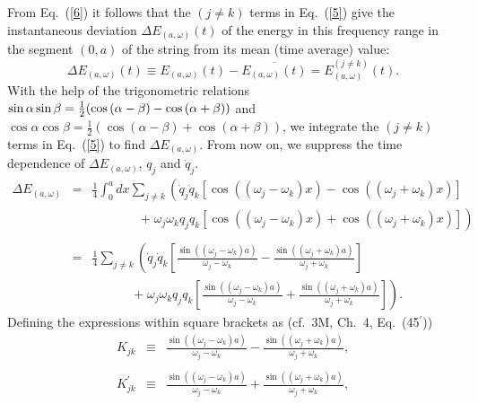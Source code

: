 \documentclass[12pt]{elsart}
\begin{document}
From Eq.\  (\ref{6}) it follows that the $(j \neq k)$ terms in Eq.\ (\ref{5}) give the instantaneous deviation $\Delta E_{(a, \omega)}(t)$ of the energy in this frequency range in the segment $(0,a)$ of the string from its mean (time average) value:
\begin{equation}
\Delta E_{(a, \omega)}(t) \equiv E_{(a, \omega)}(t) -  \overline{E_{(a, \omega)}(t)} = E_{(a, \omega)}^{(j \neq k)}(t).
\label{9}
\end{equation}
With the help of the trigonometric relations $\sin{\alpha}\sin{\beta} = \frac{1}{2} (\cos{(\alpha - \beta)} - \break \cos{(\alpha + \beta)})$ and  $\cos{\alpha}\cos{\beta} = \frac{1}{2} (\cos{(\alpha - \beta)} + \cos{(\alpha + \beta)})$, we integrate the $(j \neq k)$ terms  in Eq.\ (\ref{5}) to find $\Delta E_{(a, \omega)}$. From now on, we suppress the time dependence of $\Delta E_{(a, \omega)}$, $q_j$ and $\dot{q}_j$.
\begin{eqnarray}
\Delta E_{(a, \omega)} & = & \frac{1}{4}  \int_0^a dx \sum_{j \neq k} \left( \dot{q}_j \dot{q}_k 
\left[ \cos{((\omega_j - \omega_k)x)} - \cos{((\omega_j + \omega_k)x)}\right]  \right. \nonumber \\
& & \;\;\;\;\;\;\;\;\;\;\;\;\;\; \left. +  \;  \omega_j \omega_k q_j q_k 
\left[ \cos{((\omega_j - \omega_k)x)} + \cos{((\omega_j + \omega_k)x)}\right] \right) \nonumber \\
 & & \label{11} \\
 & = & \frac{1}{4}  \sum_{j \neq k} \left( \dot{q}_j \dot{q}_k 
 \left[ \frac{\sin{((\omega_j - \omega_k)a)}}{\omega_j - \omega_k} -  
 \frac{\sin{((\omega_j + \omega_k)a)}}{\omega_j + \omega_k} \right] \right. \nonumber \\  
& & \;\;\;\;\;\;\;\;\;\;\;\; \left. + \;  \omega_j \omega_k q_j q_k 
\left[ \frac{\sin{((\omega_j - \omega_k)a)}}{\omega_j - \omega_k} +  
 \frac{\sin{((\omega_j + \omega_k)a)}}{\omega_j + \omega_k} \right]  \right). \nonumber
\end{eqnarray}
Defining the expressions within square brackets as (cf.\ 3M, Ch.\ 4, Eq.\ (45$^\prime$))
\begin{eqnarray}
K_{jk} & \equiv &  \frac{\sin{((\omega_j - \omega_k)a)}}{\omega_j - \omega_k} -  
 \frac{\sin{((\omega_j + \omega_k)a)}}{\omega_j + \omega_k}, \nonumber \\
 & & \label{11a} \\
K^\prime_{jk} & \equiv & \frac{\sin{((\omega_j - \omega_k)a)}}{\omega_j - \omega_k} +  
 \frac{\sin{((\omega_j + \omega_k)a)}}{\omega_j + \omega_k}, \nonumber
\end{eqnarray}
\end{document}
